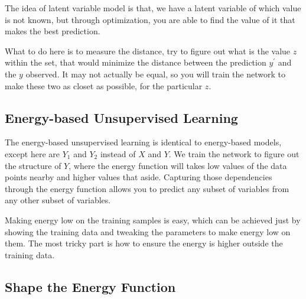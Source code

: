 The idea of latent variable model is that, we have a latent variable of which value is not known, but through optimization, you are able to find the value of it that makes the best prediction.

What to do here is to measure the distance, try to figure out what is the value $z$ within the set, that would minimize the distance between the prediction $y^\prime$ and the $y$ observed. It may not actually be equal, so you will train the network to make these two as closet as possible, for the particular $z$.

\subsection{Energy-based Unsupervised Learning}

The energy-based unsupervised learning is identical to energy-based models, except here are $Y_1$ and $Y_2$ instead of $X$ and $Y$. We train the network to figure out the structure of $Y$, where the energy function will takes low values of the data points nearby and higher values that aside. Capturing those dependencies through the energy function allows you to predict any subset of variables from any other subset of variables.

Making energy low on the training samples is easy, which can be achieved just by showing the training data and tweaking the parameters to make energy low on them. The most tricky part is how to ensure the energy is higher outside the training data.

\subsection{Shape the Energy Function}

